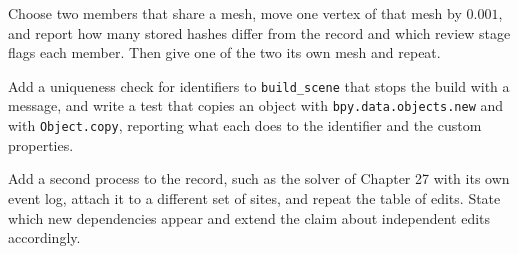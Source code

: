 \begin{exercise}
Choose two members that share a mesh, move one vertex of that mesh by $0.001$, and report how many stored hashes differ from the record and which review stage flags each member. Then give one of the two its own mesh and repeat.
\end{exercise}

\begin{exercise}
Add a uniqueness check for identifiers to \texttt{build\_scene} that stops the build with a message, and write a test that copies an object with \texttt{bpy.data.objects.new} and with \texttt{Object.copy}, reporting what each does to the identifier and the custom properties.
\end{exercise}

\begin{exercise}
Add a second process to the record, such as the solver of Chapter 27 with its own event log, attach it to a different set of sites, and repeat the table of edits. State which new dependencies appear and extend the claim about independent edits accordingly.
\end{exercise}
